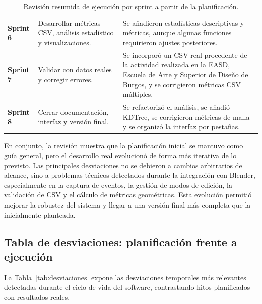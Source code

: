 \begin{table}[H]
\begin{tabularx}{\textwidth}{p{1.8cm}X X}
\textbf{Sprint 6} &
Desarrollar métricas CSV, análisis estadístico y visualizaciones. &
Se añadieron estadísticas descriptivas y métricas, aunque algunas funciones requirieron ajustes posteriores. \\

\textbf{Sprint 7} &
Validar con datos reales y corregir errores. &
Se incorporó un CSV real procedente de la actividad realizada en la EASD, Escuela de Arte y Superior de Diseño de Burgos, y se corrigieron métricas CSV múltiples. \\

\textbf{Sprint 8} &
Cerrar documentación, interfaz y versión final. &
Se refactorizó el análisis, se añadió KDTree, se corrigieron métricas de malla y se organizó la interfaz por pestañas. \\
\bottomrule
\end{tabularx}
\caption{Revisión resumida de ejecución por sprint a partir de la planificación.}
\label{tab:revision-sprints}
\end{table}

En conjunto, la revisión muestra que la planificación inicial se mantuvo como guía general, pero el desarrollo real evolucionó de forma más iterativa de lo previsto. Las principales desviaciones no se debieron a cambios arbitrarios de alcance, sino a problemas técnicos detectados durante la integración con Blender, especialmente en la captura de eventos, la gestión de modos de edición, la validación de CSV y el cálculo de métricas geométricas. Esta evolución permitió mejorar la robustez del sistema y llegar a una versión final más completa que la inicialmente planteada.

\subsection{Tabla de desviaciones: planificación frente a ejecución}
\label{subsec:a-desviaciones}

La Tabla~\ref{tab:desviaciones} expone las desviaciones temporales más relevantes detectadas durante el ciclo de vida del software, contrastando hitos planificados con resultados reales.

